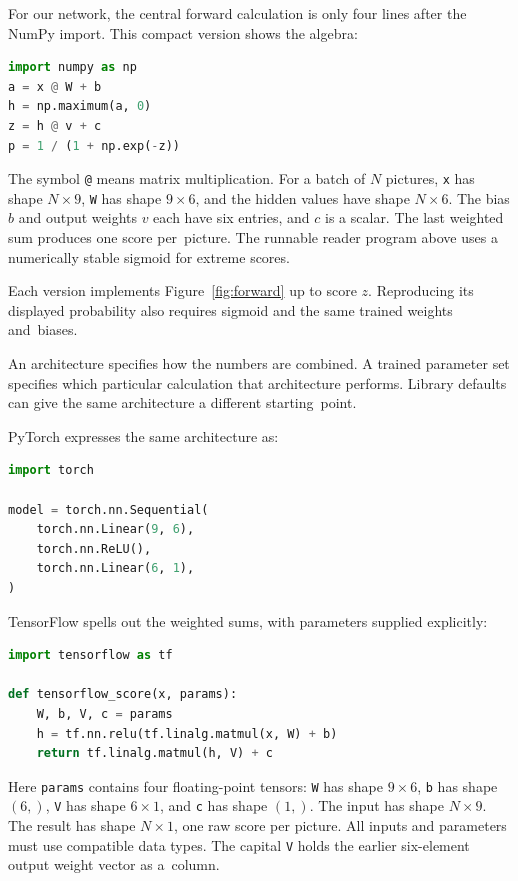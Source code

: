 \noindent\begin{minipage}{\linewidth}
For our network, the central forward calculation is only four lines after the NumPy import. This compact version shows the algebra:
\begin{lstlisting}[language=Python]
import numpy as np
a = x @ W + b
h = np.maximum(a, 0)
z = h @ v + c
p = 1 / (1 + np.exp(-z))
\end{lstlisting}
\end{minipage}
The symbol \texttt{@} means matrix multiplication. For a batch of $N$ pictures, \texttt{x} has shape $N\times9$, \texttt{W} has shape $9\times6$, and the hidden values have shape $N\times6$. The bias $b$ and output weights $v$ each have six entries, and $c$ is a scalar. The last weighted sum produces one score per~picture. The runnable reader program above uses a numerically stable sigmoid for extreme scores.

Each version implements Figure~\ref{fig:forward} up to score $z$. Reproducing its displayed probability also requires sigmoid and the same trained weights and~biases.

An architecture specifies how the numbers are combined. A trained parameter set specifies which particular calculation that architecture performs. Library defaults can give the same architecture a different starting~point.

\noindent\begin{minipage}{\linewidth}
PyTorch expresses the same architecture as:
\begin{lstlisting}[language=Python]
import torch

model = torch.nn.Sequential(
    torch.nn.Linear(9, 6),
    torch.nn.ReLU(),
    torch.nn.Linear(6, 1),
)
\end{lstlisting}
\end{minipage}

\noindent\begin{minipage}{\linewidth}
TensorFlow spells out the weighted sums, with parameters supplied explicitly:
\begin{lstlisting}[language=Python]
import tensorflow as tf

def tensorflow_score(x, params):
    W, b, V, c = params
    h = tf.nn.relu(tf.linalg.matmul(x, W) + b)
    return tf.linalg.matmul(h, V) + c
\end{lstlisting}

Here \texttt{params} contains four floating-point tensors: \texttt{W} has shape $9\times6$, \texttt{b} has shape $(6,)$, \texttt{V} has shape $6\times1$, and \texttt{c} has shape $(1,)$. The input has shape $N\times9$. The result has shape $N\times1$, one raw score per picture. All inputs and parameters must use compatible data types. The capital \texttt{V} holds the earlier six-element output weight vector as a~column.
\end{minipage}

